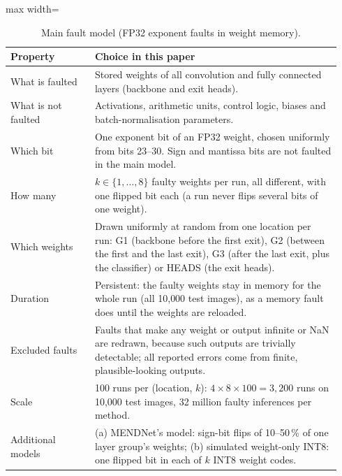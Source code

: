 \documentclass[10pt,a4paper]{article}
\begin{document}
\begin{table}[H]
\centering\small
\caption{Main fault model (FP32 exponent faults in weight memory).}
\label{tab:faultmodel}
\begin{adjustbox}{max width=\linewidth}
\begin{tabular}{@{}p{0.24\linewidth}p{0.70\linewidth}@{}}
\toprule
Property & Choice in this paper \\
\midrule
What is faulted        & Stored weights of all convolution and fully connected layers (backbone and exit heads). \\
What is not faulted    & Activations, arithmetic units, control logic, biases and batch-normalisation parameters. \\
Which bit              & One exponent bit of an FP32 weight, chosen uniformly from bits 23--30. Sign and mantissa
                         bits are not faulted in the main model. \\
How many               & $k\in\{1,\dots,8\}$ faulty weights per run, all different, with one flipped bit each
                         (a run never flips several bits of one weight). \\
Which weights          & Drawn uniformly at random from one location per run: G1 (backbone before the first exit),
                         G2 (between the first and the last exit), G3 (after the last exit, plus the classifier) or
                         HEADS (the exit heads). \\
Duration               & Persistent: the faulty weights stay in memory for the whole run (all 10{,}000 test images),
                         as a memory fault does until the weights are reloaded. \\
Excluded faults        & Faults that make any weight or output infinite or NaN are redrawn, because such outputs are
                         trivially detectable; all reported errors come from finite, plausible-looking outputs. \\
Scale                  & 100 runs per (location, $k$): $4\times8\times100 = 3{,}200$ runs on 10{,}000 test images,
                         32 million faulty inferences per method. \\
Additional models      & (a) MENDNet's model: sign-bit flips of 10--50\,\% of one layer group's weights;
                         (b) simulated weight-only INT8: one flipped bit in each of $k$ INT8 weight codes. \\
\bottomrule
\end{tabular}
\end{adjustbox}
\end{table}
\end{document}
